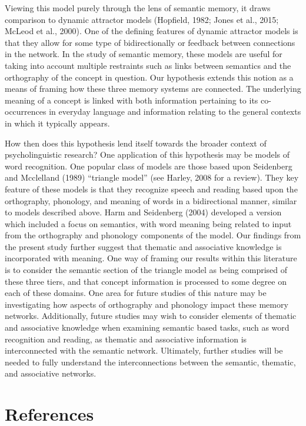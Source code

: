 \documentclass[english,man]{apa6}
\theoremstyle{definition}
\theoremstyle{definition}
\theoremstyle{definition}
\theoremstyle{remark}
\begin{document}
Viewing this model purely through the lens of semantic memory, it draws
comparison to dynamic attractor models (Hopfield, 1982; Jones et al.,
2015; McLeod et al., 2000). One of the defining features of dynamic
attractor models is that they allow for some type of bidirectionally or
feedback between connections in the network. In the study of semantic
memory, these models are useful for taking into account multiple
restraints such as links between semantics and the orthography of the
concept in question. Our hypothesis extends this notion as a means of
framing how these three memory systems are connected. The underlying
meaning of a concept is linked with both information pertaining to its
co-occurrences in everyday language and information relating to the
general contexts in which it typically appears.

How then does this hypothesis lend itself towards the broader context of
psycholinguistic research? One application of this hypothesis may be
models of word recognition. One popular class of models are those based
upon Seidenberg and Mcclelland (1989) \enquote{triangle model} (see
Harley, 2008 for a review). They key feature of these models is that
they recognize speech and reading based upon the orthography, phonology,
and meaning of words in a bidirectional manner, similar to models
described above. Harm and Seidenberg (2004) developed a version which
included a focus on semantics, with word meaning being related to input
from the orthography and phonology components of the model. Our findings
from the present study further suggest that thematic and associative
knowledge is incorporated with meaning. One way of framing our results
within this literature is to consider the semantic section of the
triangle model as being comprised of these three tiers, and that concept
information is processed to some degree on each of these domains. One
area for future studies of this nature may be investigating how aspects
of orthography and phonology impact these memory networks. Additionally,
future studies may wish to consider elements of thematic and associative
knowledge when examining semantic based tasks, such as word recognition
and reading, as thematic and associative information is interconnected
with the semantic network. Ultimately, further studies will be needed to
fully understand the interconnections between the semantic, thematic,
and associative networks.

\newpage

\section{References}\label{references}
\end{document}
